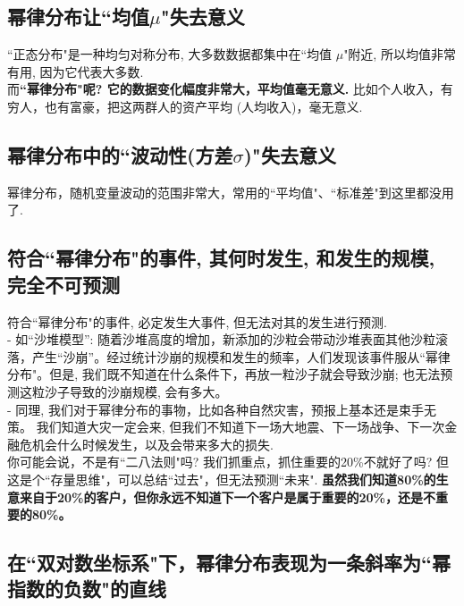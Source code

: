 \documentclass[UTF8]{ctexart}
\begin{document}
	
	
	\subsection{幂律分布让``均值$\mu$"失去意义} 
	
	``正态分布"是一种均匀对称分布, 大多数数据都集中在``均值 $\mu$"附近, 所以均值非常有用, 因为它代表大多数. \\	
	而\textbf{``幂律分布"呢? 它的数据变化幅度非常大，平均值毫无意义.} 比如个人收入，有穷人，也有富豪，把这两群人的资产平均 (人均收入)，毫无意义. 
	
	
	
	\subsection{幂律分布中的``波动性(方差$\sigma$)"失去意义}
	幂律分布，随机变量波动的范围非常大，常用的``平均值"、``标准差"到这里都没用了. 
	
	
	
	\subsection{符合``幂律分布"的事件, 其何时发生, 和发生的规模, 完全不可预测}
	符合``幂律分布"的事件, 必定发生大事件, 但无法对其的发生进行预测. \\
	
	- 如``沙堆模型”: 随着沙堆高度的增加，新添加的沙粒会带动沙堆表面其他沙粒滚落，产生``沙崩”。经过统计沙崩的规模和发生的频率，人们发现该事件服从``幂律分布"。但是, 我们既不知道在什么条件下，再放一粒沙子就会导致沙崩; 也无法预测这粒沙子导致的沙崩规模, 会有多大。 \\
	- 	同理, 我们对于幂律分布的事物，比如各种自然灾害，预报上基本还是束手无策。
	我们知道大灾一定会来, 但我们不知道下一场大地震、下一场战争、下一次金融危机会什么时候发生，以及会带来多大的损失.  \\
	
	
	你可能会说，不是有``二八法则"吗? 我们抓重点，抓住重要的20\%不就好了吗? 但这是个``存量思维"，可以总结``过去"，但无法预测``未来". \textbf{虽然我们知道80\%的生意来自于20\%的客户，但你永远不知道下一个客户是属于重要的20\%，还是不重要的80\%。} \\
	
	
	
	
	\subsection{在``双对数坐标系"下，幂律分布表现为一条斜率为``幂指数的负数"的直线}
	
\end{document}
